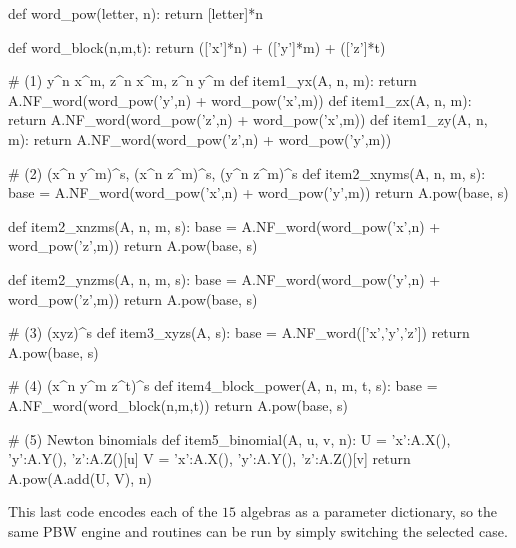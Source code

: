 \documentclass{amsart}
\theoremstyle{definition}
\theoremstyle{remark}
\numberwithin{equation}{section}
\begin{document}
\begin{MyVerbatim}
def word_pow(letter, n):
    return [letter]*n

def word_block(n,m,t):
    return (['x']*n) + (['y']*m) + (['z']*t)

# (1) y^n x^m, z^n x^m, z^n y^m
def item1_yx(A, n, m): return A.NF_word(word_pow('y',n) + word_pow('x',m))
def item1_zx(A, n, m): return A.NF_word(word_pow('z',n) + word_pow('x',m))
def item1_zy(A, n, m): return A.NF_word(word_pow('z',n) + word_pow('y',m))

# (2) (x^n y^m)^s, (x^n z^m)^s, (y^n z^m)^s
def item2_xnyms(A, n, m, s):
    base = A.NF_word(word_pow('x',n) + word_pow('y',m))
    return A.pow(base, s)

def item2_xnzms(A, n, m, s):
    base = A.NF_word(word_pow('x',n) + word_pow('z',m))
    return A.pow(base, s)

def item2_ynzms(A, n, m, s):
    base = A.NF_word(word_pow('y',n) + word_pow('z',m))
    return A.pow(base, s)

# (3) (xyz)^s
def item3_xyzs(A, s):
    base = A.NF_word(['x','y','z'])
    return A.pow(base, s)

# (4) (x^n y^m z^t)^s
def item4_block_power(A, n, m, t, s):
    base = A.NF_word(word_block(n,m,t))
    return A.pow(base, s)

# (5) Newton binomials
def item5_binomial(A, u, v, n):
    U = {'x':A.X(), 'y':A.Y(), 'z':A.Z()}[u]
    V = {'x':A.X(), 'y':A.Y(), 'z':A.Z()}[v]
    return A.pow(A.add(U, V), n)
\end{MyVerbatim}

This last code encodes each of the $15$ algebras as a parameter dictionary, so the same PBW engine and routines can be run by simply switching the selected case.
\end{document}
